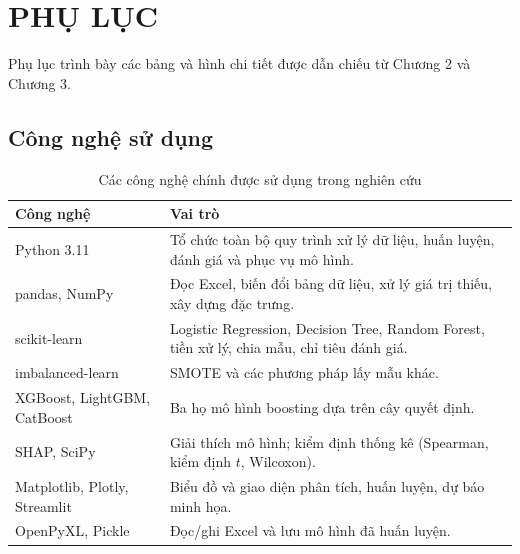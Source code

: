 \chapter*{PHỤ LỤC}
\renewcommand{\thesection}{P\arabic{section}}
\renewcommand{\theHsection}{P\arabic{section}}%
\setcounter{section}{0}
\renewcommand{\thetable}{P\arabic{section}.\arabic{table}}
\renewcommand{\thefigure}{P\arabic{section}.\arabic{figure}}

Phụ lục trình bày các bảng và hình chi tiết được dẫn chiếu từ Chương 2 và Chương 3.

\section{Công nghệ sử dụng}

\begin{table}[H]
\centering
\caption{Các công nghệ chính được sử dụng trong nghiên cứu}
\label{tab:technologies}
\begin{tabular}{|p{4.0cm}|p{9.8cm}|}
\hline
\textbf{Công nghệ} & \textbf{Vai trò}\\
\hline
Python 3.11 & Tổ chức toàn bộ quy trình xử lý dữ liệu, huấn luyện, đánh giá và phục vụ mô hình.\\
\hline
pandas, NumPy & Đọc Excel, biến đổi bảng dữ liệu, xử lý giá trị thiếu, xây dựng đặc trưng.\\
\hline
scikit-learn & Logistic Regression, Decision Tree, Random Forest, tiền xử lý, chia mẫu, chỉ tiêu đánh giá.\\
\hline
imbalanced-learn & SMOTE và các phương pháp lấy mẫu khác.\\
\hline
XGBoost, LightGBM, CatBoost & Ba họ mô hình boosting dựa trên cây quyết định.\\
\hline
SHAP, SciPy & Giải thích mô hình; kiểm định thống kê (Spearman, kiểm định $t$, Wilcoxon).\\
\hline
Matplotlib, Plotly, Streamlit & Biểu đồ và giao diện phân tích, huấn luyện, dự báo minh họa.\\
\hline
OpenPyXL, Pickle & Đọc/ghi Excel và lưu mô hình đã huấn luyện.\\
\hline
\end{tabular}
\end{table}


